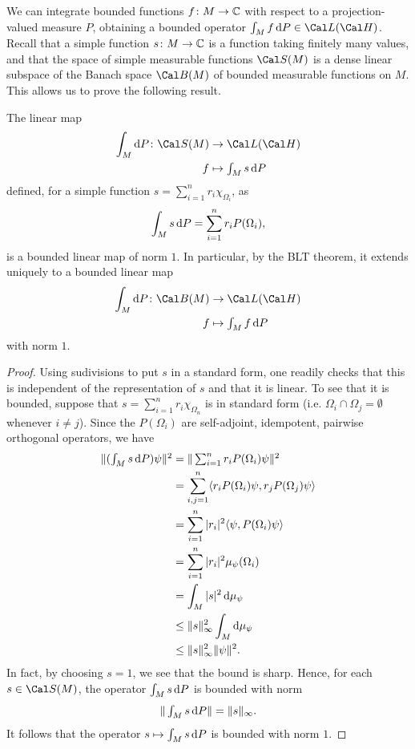 We can integrate bounded functions \(f\colon M\to\mathbb{C}\) with respect to
a projection-valued measure \(P\), obtaining a bounded operator
\(\int_Mf\d P \in \Cal L(\Cal H)\).
Recall that a simple function \(s\colon M\to \mathbb{C}\) is a function
taking finitely many values, and that the space of simple measurable
functions \(\Cal S(M)\) is a dense linear subspace of the Banach space
\(\Cal B(M)\) of bounded measurable functions on \(M\).
This allows us to prove the following result.
\begin{proposition}
  The linear map
  \begin{align}
    \int_M\d P\colon \Cal S(M) &\to \Cal L(\Cal H) \\
    f &\mapsto \textstyle\int_M s\d P
  \end{align}
  defined,
  for a simple function \(s=\sum_{i=1}^{n}r_i\chi_{\Omega_i}\), as
  \begin{equation}
    \int_{M}^{} s \mathop{}\!\mathrm{d} P = \sum_{i=1}^{n} r_i P(\Omega_i),
  \end{equation}
  is a bounded linear map of norm \(1\).
  In particular, by the BLT theorem, it extends uniquely to a bounded
  linear map
  \begin{align}
    \int_M\d P\colon \Cal B(M) &\to \Cal L(\Cal H) \\
    f &\mapsto \textstyle\int_M f\d P
  \end{align}
  with norm \(1\).
\end{proposition}
\begin{proof}
   Using sudivisions to put \(s\) in a standard form, one readily
   checks that this is independent of the representation of \(s\) and
   that it is linear.
   To see that it is bounded, suppose that
   \(s=\sum_{i=1}^{n}r_i\chi_{\Omega_n}\) is in standard form (i.e.
   \(\Omega_i\cap\Omega_j=\emptyset\) whenever \(i\neq j\)).
   Since the \(P(\Omega_i)\) are self-adjoint, idempotent, pairwise
   orthogonal operators, we have
   \begin{align}
     \| (\textstyle\int_Ms\mathop{}\!\mathrm{d} P)\psi \|^{2}
     &= \|\textstyle\sum_{i=1}^{n}r_iP(\Omega_i)\psi \|^{2} \\
     &= \sum_{i,j=1}^{n}
       \langle r_iP(\Omega_i)\psi,r_jP(\Omega_j)\psi \rangle \\
     &= \sum_{i=1}^{n} |r_i|^{2}
       \langle \psi,P(\Omega_i)\psi \rangle \\
     &= \sum_{i=1}^{n} |r_i|^{2} \mu_\psi(\Omega_i) \\
     &= \int_{M} |s|^{2}\mathop{}\!\mathrm{d}\mu_\psi \\
     &\leq \|s\|_{\infty}^{2}\int_{M} \mathop{}\!\mathrm{d}\mu_\psi \\
     &\leq \|s\|_{\infty}^{2} \|\psi\|^{2}
   .\end{align}
   In fact, by choosing \(s=1\), we see that the bound is sharp.
   Hence, for each \(s\in\Cal S(M)\), the operator \(\int_Ms\mathop{}\!\mathrm{d} P\) is
   bounded with norm
   \begin{equation}
     \|\textstyle\int_Ms\mathop{}\!\mathrm{d} P\| = \|s\|_{\infty}
   .\end{equation}
   It follows that the operator \(s\mapsto \int_Ms\mathop{}\!\mathrm{d} P\) is bounded
   with norm \(1\).
\end{proof}

